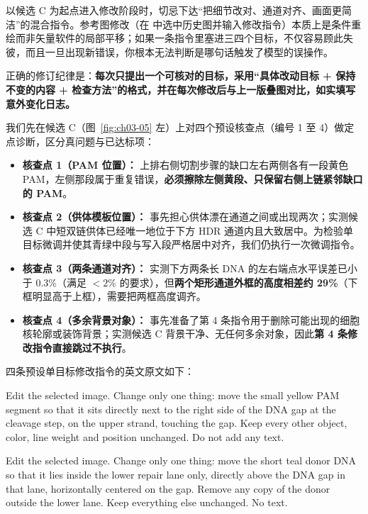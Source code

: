 以候选 C 为起点进入修改阶段时，切忌下达“把细节改对、通道对齐、画面更简洁”的混合指令。参考图修改（在 \scidraw{} 中选中历史图并输入修改指令）本质上是条件重绘而非矢量软件的局部平移；如果一条指令里塞进三四个目标，不仅容易顾此失彼，而且一旦出现新错误，你根本无法判断是哪句话触发了模型的误操作。

正确的修订纪律是：\textbf{每次只提出一个可核对的目标，采用“具体改动目标 + 保持不变的内容 + 检查方法”的格式，并在每次修改后与上一版叠图对比，如实填写意外变化日志。}

我们先在候选 C（图~\ref{fig:ch03-05} 左）上对四个预设核查点（编号 1 至 4）做定点诊断，区分真问题与已达标项：

\begin{itemize}
\item \textbf{核查点 1（PAM 位置）：} 上排右侧切割步骤的缺口左右两侧各有一段黄色 PAM，左侧那段属于重复错误，\textbf{必须擦除左侧黄段、只保留右侧上链紧邻缺口的 PAM}。
\item \textbf{核查点 2（供体模板位置）：} 事先担心供体漂在通道之间或出现两次；实测候选 C 中短双链供体已经唯一地位于下方 HDR 通道内且大致居中。为检验单目标微调并使其青绿中段与写入段严格居中对齐，我们仍执行一次微调指令。
\item \textbf{核查点 3（两条通道对齐）：} 实测下方两条长 DNA 的左右端点水平误差已小于 0.3\%（满足 $<2\%$ 的要求），但\textbf{两个矩形通道外框的高度相差约 29\%}（下框明显高于上框），需要把两框高度调齐。
\item \textbf{核查点 4（多余背景对象）：} 事先准备了第 4 条指令用于删除可能出现的细胞核轮廓或装饰背景；实测候选 C 背景干净、无任何多余对象，因此\textbf{第 4 条修改指令直接跳过不执行}。
\end{itemize}

四条预设单目标修改指令的英文原文如下：

\begin{Prompt}
 Edit the selected image. Change only one thing: move the small yellow PAM segment so that it sits directly next to the right side of the DNA gap at the cleavage step, on the upper strand, touching the gap. Keep every other object, color, line weight and position unchanged. Do not add any text.
\end{Prompt}

\begin{Prompt}
 Edit the selected image. Change only one thing: move the short teal donor DNA so that it lies inside the lower repair lane only, directly above the DNA gap in that lane, horizontally centered on the gap. Remove any copy of the donor outside the lower lane. Keep everything else unchanged. No text.
\end{Prompt}

